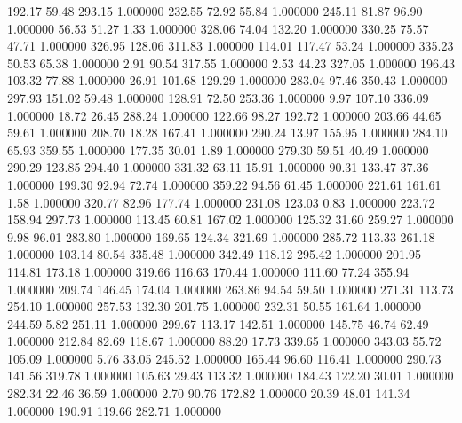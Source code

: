     192.17     59.48    293.15  1.000000
    232.55     72.92     55.84  1.000000
    245.11     81.87     96.90  1.000000
     56.53     51.27      1.33  1.000000
    328.06     74.04    132.20  1.000000
    330.25     75.57     47.71  1.000000
    326.95    128.06    311.83  1.000000
    114.01    117.47     53.24  1.000000
    335.23     50.53     65.38  1.000000
      2.91     90.54    317.55  1.000000
      2.53     44.23    327.05  1.000000
    196.43    103.32     77.88  1.000000
     26.91    101.68    129.29  1.000000
    283.04     97.46    350.43  1.000000
    297.93    151.02     59.48  1.000000
    128.91     72.50    253.36  1.000000
      9.97    107.10    336.09  1.000000
     18.72     26.45    288.24  1.000000
    122.66     98.27    192.72  1.000000
    203.66     44.65     59.61  1.000000
    208.70     18.28    167.41  1.000000
    290.24     13.97    155.95  1.000000
    284.10     65.93    359.55  1.000000
    177.35     30.01      1.89  1.000000
    279.30     59.51     40.49  1.000000
    290.29    123.85    294.40  1.000000
    331.32     63.11     15.91  1.000000
     90.31    133.47     37.36  1.000000
    199.30     92.94     72.74  1.000000
    359.22     94.56     61.45  1.000000
    221.61    161.61      1.58  1.000000
    320.77     82.96    177.74  1.000000
    231.08    123.03      0.83  1.000000
    223.72    158.94    297.73  1.000000
    113.45     60.81    167.02  1.000000
    125.32     31.60    259.27  1.000000
      9.98     96.01    283.80  1.000000
    169.65    124.34    321.69  1.000000
    285.72    113.33    261.18  1.000000
    103.14     80.54    335.48  1.000000
    342.49    118.12    295.42  1.000000
    201.95    114.81    173.18  1.000000
    319.66    116.63    170.44  1.000000
    111.60     77.24    355.94  1.000000
    209.74    146.45    174.04  1.000000
    263.86     94.54     59.50  1.000000
    271.31    113.73    254.10  1.000000
    257.53    132.30    201.75  1.000000
    232.31     50.55    161.64  1.000000
    244.59      5.82    251.11  1.000000
    299.67    113.17    142.51  1.000000
    145.75     46.74     62.49  1.000000
    212.84     82.69    118.67  1.000000
     88.20     17.73    339.65  1.000000
    343.03     55.72    105.09  1.000000
      5.76     33.05    245.52  1.000000
    165.44     96.60    116.41  1.000000
    290.73    141.56    319.78  1.000000
    105.63     29.43    113.32  1.000000
    184.43    122.20     30.01  1.000000
    282.34     22.46     36.59  1.000000
      2.70     90.76    172.82  1.000000
     20.39     48.01    141.34  1.000000
    190.91    119.66    282.71  1.000000
